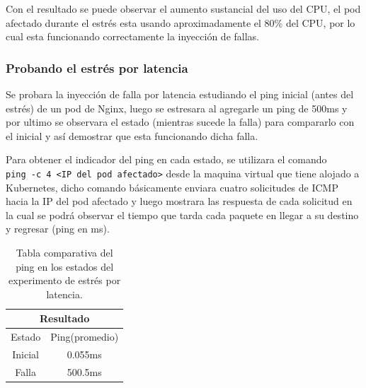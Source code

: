 \par Con el resultado se puede observar el aumento sustancial del uso del CPU, el pod afectado durante el estrés esta usando aproximadamente el 80\% del CPU, por lo cual esta funcionando correctamente la inyección de fallas.\\

\subsubsection{Probando el estrés por latencia}


\par Se probara la inyección de falla por latencia estudiando el ping inicial (antes del estrés) de un pod de Nginx, luego se estresara al agregarle un ping de 500ms y por ultimo se observara el estado (mientras sucede la falla) para compararlo con el inicial y así demostrar que esta funcionando dicha falla.\\

\par Para obtener el indicador del ping en cada estado, se utilizara el comando \\ \verb|ping -c 4 <IP del pod afectado>| desde la maquina virtual que tiene alojado a Kubernetes, dicho comando básicamente enviara cuatro solicitudes de ICMP hacia la IP del pod afectado y luego mostrara las respuesta de cada solicitud en la cual se podrá observar el tiempo que tarda cada paquete en llegar a su destino y regresar (ping en ms).\\
\begin{table}[ht!]
\begin{center}
\begin{tabular}{ |c|c| } 
 \hline
 \multicolumn{2}{|c|}{Resultado} \\
 \hline
 \hline
 Estado & Ping(promedio)\\
 \hline
 Inicial & 0.055ms\\
 Falla & 500.5ms\\
 \hline
\end{tabular}
\end{center}
\caption{Tabla comparativa del ping en los estados del experimento de estrés por latencia.}
\label{tab:tabla42}
\end{table}

